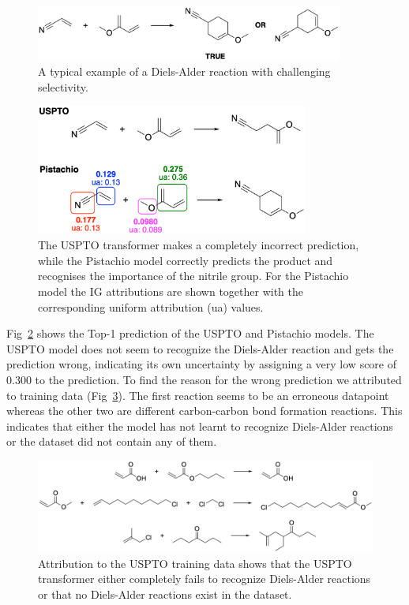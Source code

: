 \begin{figure}[htbp!] 
\centering    
\includegraphics[width=0.9\textwidth]{Chapters/Ch4/Figs/da1.png}
\caption[Diels-Alder]{A typical example of a Diels-Alder reaction with challenging selectivity.}
\label{fig:da1}
\end{figure}

\begin{figure}[htbp!] 
\centering    
\includegraphics[width=0.8\textwidth]{Chapters/Ch4/Figs/da1_preds.png}
\caption[Diels-Alder]{The USPTO transformer makes a completely incorrect prediction, while the Pistachio model correctly predicts the product and recognises the importance of the nitrile group. For the Pistachio model the IG attributions are shown together with the corresponding uniform attribution (ua) values. }
\label{fig:da1_preds}
\end{figure}

Fig~\ref{fig:da1_preds} shows the Top-1 prediction of the USPTO and Pistachio models. The USPTO model does not seem to recognize the Diels-Alder reaction and gets the prediction wrong, indicating its own uncertainty by assigning a very low score of 0.300 to the prediction. To find the reason for the wrong prediction we attributed to training data (Fig~\ref{fig:da1_uspto_dat}). The first reaction seems to be an erroneous datapoint whereas the other two are different carbon-carbon bond formation reactions. This indicates that either the model has not learnt to recognize Diels-Alder reactions or the dataset did not contain any of them. 

\begin{figure}[htbp!] 
\centering    
\includegraphics[width=1.0\textwidth]{Chapters/Ch4/Figs/da1_uspto_dat.png}
\caption[Diels-Alder]{Attribution to the USPTO training data shows that the USPTO transformer either completely fails to recognize Diels-Alder reactions or that no Diels-Alder reactions exist in the dataset. }
\label{fig:da1_uspto_dat}
\end{figure}

